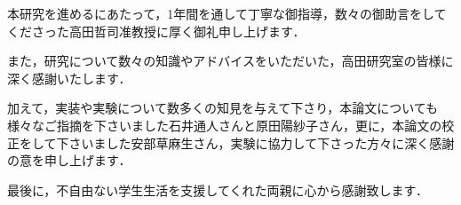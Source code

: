 \begin{ackn}{}

本研究を進めるにあたって，1年間を通して丁寧な御指導，数々の御助言をしてくださった高田哲司准教授に厚く御礼申し上げます．

また，研究について数々の知識やアドバイスをいただいた，高田研究室の皆様に深く感謝いたします．

加えて，実装や実験について数多くの知見を与えて下さり，本論文についても様々なご指摘を下さいました石井通人さんと原田陽紗子さん，更に，本論文の校正をして下さいました安部草麻生さん，実験に協力して下さった方々に深く感謝の意を申し上げます．

最後に，不自由ない学生生活を支援してくれた両親に心から感謝致します．

\end{ackn}{}
\newpage
